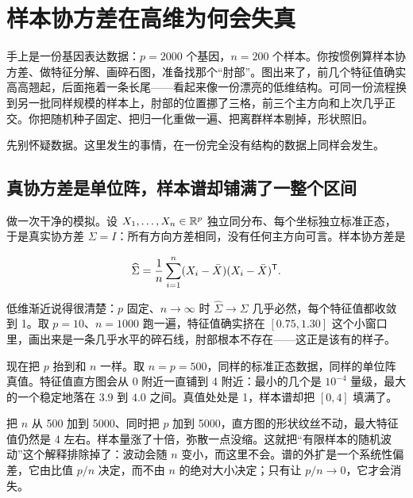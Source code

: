 \section{样本协方差在高维为何会失真}
\label{sec:11-Mathematical-Statistics/09-Random-Matrix-Theory/01}

手上是一份基因表达数据：\(p=2000\) 个基因，\(n=200\) 个样本。你按惯例算样本协方差、做特征分解、画碎石图，准备找那个``肘部''。图出来了，前几个特征值确实高高翘起，后面拖着一条长尾——看起来像一份漂亮的低维结构。可同一份流程换到另一批同样规模的样本上，肘部的位置挪了三格，前三个主方向和上次几乎正交。你把随机种子固定、把归一化重做一遍、把离群样本剔掉，形状照旧。

先别怀疑数据。这里发生的事情，在一份完全没有结构的数据上同样会发生。

\subsection{真协方差是单位阵，样本谱却铺满了一整个区间}

做一次干净的模拟。设 \(X_1,\ldots,X_n\in\mathbb{R}^p\) 独立同分布、每个坐标独立标准正态，于是真实协方差 \(\Sigma=I\)：所有方向方差相同，没有任何主方向可言。样本协方差是

\[
\widehat\Sigma=\frac1n\sum_{i=1}^n(X_i-\bar X)(X_i-\bar X)^{\mathsf{T}}.
\]

低维渐近说得很清楚：\(p\) 固定、\(n\to\infty\) 时 \(\widehat\Sigma\to\Sigma\) 几乎必然，每个特征值都收敛到 1。取 \(p=10\)、\(n=1000\) 跑一遍，特征值确实挤在 \([0.75,1.30]\) 这个小窗口里，画出来是一条几乎水平的碎石线，肘部根本不存在——这正是该有的样子。

现在把 \(p\) 抬到和 \(n\) 一样。取 \(n=p=500\)，同样的标准正态数据，同样的单位阵真值。特征值直方图会从 0 附近一直铺到 4 附近：最小的几个是 \(10^{-4}\) 量级，最大的一个稳定地落在 \(3.9\) 到 \(4.0\) 之间。真值处处是 1，样本谱却把 \([0,4]\) 填满了。

把 \(n\) 从 500 加到 5000、同时把 \(p\) 加到 5000，直方图的形状纹丝不动，最大特征值仍然是 4 左右。样本量涨了十倍，弥散一点没缩。这就把``有限样本的随机波动''这个解释排除掉了：波动会随 \(n\) 变小，而这里不会。谱的外扩是一个系统性偏差，它由比值 \(p/n\) 决定，而不由 \(n\) 的绝对大小决定；只有让 \(p/n\to0\)，它才会消失。

